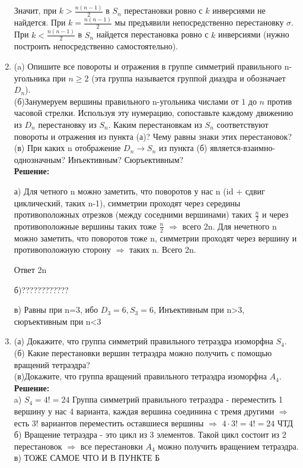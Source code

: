 \documentclass[]{book}
\theoremstyle{definition}
\begin{document}
\begin{enumerate}[resume]
Значит, при $k > \frac{n(n-1)}{2}$ в $S_n$ перестановки ровно с $k$ инверсиями не найдется. При $k = \frac{n(n-1)}{2}$ мы предъявили непосредственно перестановку $\sigma$. При $k < \frac{n(n-1)}{2}$ в $S_n$ найдется перестановка ровно с $k$ инверсиями (нужно построить непосредственно самостоятельно).

\item (a) Опишите все повороты и отражения в группе симметрий правильного n-угольника при $n\geq2$ (эта группа называется группой диаэдра и обозначает $D_n$).\\
(б)Занумеруем вершины правильного n-угольника числами от $1$ до $n$ против часовой стрелки. Используя эту нумерацию, сопоставьте каждому движению из $D_n$ перестановку из $S_n$. Каким перестановкам из $S_n$ соответствуют повороты и отражения из пункта (а)? Чему равны знаки этих перестановок?\\
(в) При каких n отображение $D_n \longrightarrow S_n$ из пункта (б) является-взаимно-однозначным? Инъективным? Сюръективным?\\
\textbf{Решение:}

а) Для четного n можно заметить, что поворотов у нас n (id + сдвиг циклический, таких n-1), симметрии проходят через середины противоположных отрезков (между соседними вершинами) таких $\frac{n}{2}$ и через противоположные вершины таких тоже $\frac{n}{2}$ $\Rightarrow$ всего 2n.
Для нечетного n можно заметить, что поворотов тоже n, симметрии проходят через вершину и противоположную сторону $\Rightarrow$ таких n. Всего 2n.

Ответ 2n

б)????????????

в) Равны при n=3, ибо $D_3 = 6, S_3 = 6$, Инъективным при n>3, сюръективным при n<3

\item (а) Докажите, что группа симметрий правильного тетраэдра изоморфна $S_4$.\\
(б) Какие перестановки вершин тетраэдра можно получить с помощью вращений тетраэдра?\\
(в)Докажите, что группа вращений правильного тетраэдра изоморфна $A_4$.\\
\textbf{Решение:}\\
a) $S_4 = 4!=24$ Группа симметрий правильного тетраэдра - переместить 1 вершину у нас 4 варианта, каждая вершина соединина с тремя другими $\Rightarrow$ есть 3! вариантов переместить оставшиеся вершины $\Rightarrow$ $4\cdot 3!=4!=24$ ЧТД\\
б) Вращение тетраэдра - это цикл из 3 элементов. Такой цикл состоит из 2 перестановок $\Rightarrow$ все перестановки $A_4$ можно получить вращением тетраэдра. \\
в) ТОЖЕ САМОЕ ЧТО И В ПУНКТЕ Б




\end{enumerate}
\end{document}
